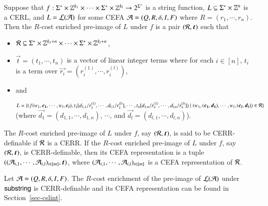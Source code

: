 \begin{definition}
Suppose that $f: \Sigma^* \times \mathbb{Z}^{k_1} \times \cdots \times \Sigma^* \times \mathbb{Z}^{k_l} \rightarrow 2^{\Sigma^*}$ is a string function, $L \subseteq \Sigma^* \times \mathbb{Z}^n$ is a CERL, and $L = \mathcal{L}(\mathcal{A})$ for some CEFA $\mathcal{A}=(Q, R, \delta, I, F)$ where $R= (r_1, \cdots, r_n)$. Then the $R$-cost enriched pre-image of $L$ under $f$ is a pair $(\cR, \vec{t})$ such that 
\begin{itemize}
\item $\mathcal{R} \subseteq \Sigma^* \times \mathbb{Z}^{k_1 + n} \times \cdots \times \Sigma^* \times \mathbb{Z}^{k_l + n}$,
\item $\vec{t} = (t_1, \cdots ,t_n)$ is a vector of linear integer terms where for each $i \in [n]$, $t_i$ is a term over $\vec{r_i} = (r^{(1)}_i, \cdots, r^{(l)}_i)$,
\item and 

$L = \{(f(w_1, \vec{c_1}, \cdots, w_l, \vec{c_l}), t_1[d_{1,1}/r^{(1)}_1, \cdots, d_{l, 1}/r^{(l)}_1], \cdots, t_n[d_{1,n}/r^{(1)}_n, \cdots, d_{l, n}/r^{(l)}_n]) \mid (w_1, (\vec{c_1}, \vec{d_1}), \cdots, w_l, (\vec{c_l}, \vec{d_l})) \in \cR\}$ 
%
(where $\vec{d_1}=(d_{1,1}, \cdots, d_{1,n})$, $\cdots$, and $\vec{d_l}=(d_{l,1},\cdots, d_{l,n})$).
\end{itemize}
The $R$-cost enriched pre-image of $L$ under $f$, say $(\cR, \vec{t})$, is said to be CERR-definable if $\mathcal{R}$ is a CERR. If the $R$-cost enriched pre-image of $L$ under $f$, say $(\cR, \vec{t})$, is CERR-definable,  then its CEFA representation is a tuple $((\Aut_{i,1}, \cdots, \Aut_{i, l})_{i \in [m]}, \vec{t})$, where $(\mathcal{A}_{i,1}, \cdots, \mathcal{A}_{i, l})_{i \in [m]}$ is a CEFA representation of $\mathcal{R}$. 
\end{definition}


\begin{example}
Let $\mathcal{A} = (Q, R, \delta, I, F)$. The $R$-cost enrichment of the pre-image of $\mathcal{L}(\mathcal{A})$ under $\mathsf{substring}$ is CERR-definable and its CEFA representation can be found in Section~\ref{sec-cslint}.
\end{example}




